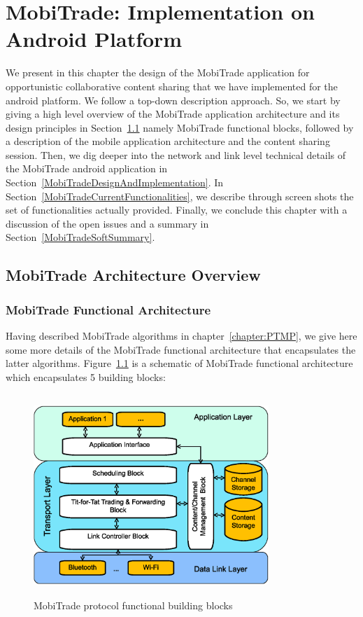﻿\chapter{MobiTrade: Implementation on Android Platform}
\label{chapter:MobiTrade}
\minitoc

We present in this chapter the design of the MobiTrade application for opportunistic collaborative content sharing that we have implemented for the android platform. We follow a top-down description approach. So, we start by giving a high level overview of the MobiTrade application architecture and its design principles in Section~\ref{MobiTradeArchitecture} namely MobiTrade functional blocks, followed by a description of the mobile application architecture and the content sharing session. Then, we dig deeper into the network and link level technical details of the MobiTrade android application in Section~\ref{MobiTradeDesignAndImplementation}. In Section~\ref{MobiTradeCurrentFunctionalities}, we describe through screen shots the set of functionalities actually provided. Finally, we conclude this chapter with a discussion of the open issues and a summary in Section~\ref{MobiTradeSoftSummary}.

\section{MobiTrade Architecture Overview}
\label{MobiTradeArchitecture}

\subsection{MobiTrade Functional Architecture}
\label{MobiTrade-functional-architecture}

Having described MobiTrade algorithms in chapter~\ref{chapter:PTMP}, we give here some more details of the MobiTrade functional architecture that encapsulates the latter algorithms. Figure~\ref{MobiTrade-node-architecture} is a schematic of MobiTrade functional architecture which encapsulates 5 building blocks:

\begin{figure}[!h]
\centering
\includegraphics[width=3.5in,height=3in]{Chapitre6/MobiTrade_Node.eps}
\vspace{-0.1in}
\caption{MobiTrade protocol functional building blocks}
\label{MobiTrade-node-architecture}
\vspace{-0.1in}
\end{figure}

